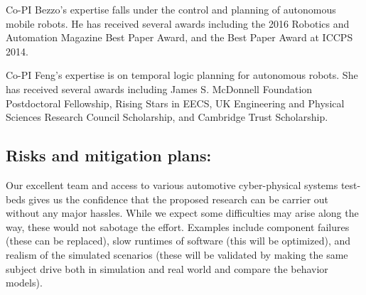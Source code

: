 Co-PI Bezzo's expertise falls under the control and planning of autonomous mobile robots. 
He has received several awards including the 2016 Robotics and Automation Magazine Best Paper Award, and the Best Paper Award at ICCPS 2014.

Co-PI Feng's expertise is on temporal logic planning for autonomous robots. She has received several awards including James S. McDonnell Foundation Postdoctoral Fellowship, Rising Stars in EECS, UK Engineering and Physical Sciences Research Council Scholarship, and Cambridge Trust Scholarship.




\vspace{-8pt}
\subsection{Risks and mitigation plans:}

Our excellent team and access to various automotive cyber-physical systems test-beds gives us the confidence that the proposed research can be carrier out without any major hassles. While we expect some difficulties may arise along the way, these would not sabotage the effort. Examples include component failures (these can be replaced), slow runtimes of software (this will be optimized), and realism of the simulated scenarios (these will be validated by making the same subject drive both in simulation and real world and compare the behavior models). 
\vspace{-12pt}
